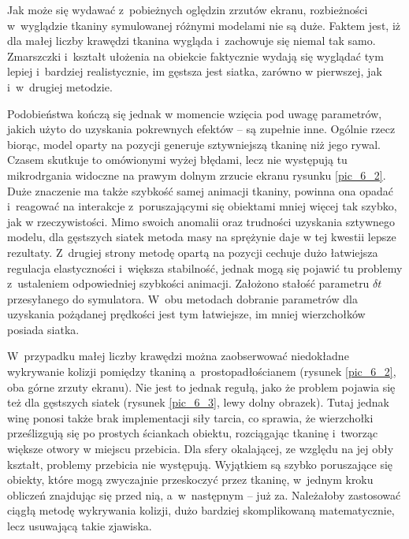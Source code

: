 		
		Jak może się wydawać z~pobieżnych oględzin zrzutów ekranu, rozbieżności w~wyglądzie tkaniny symulowanej różnymi modelami nie są duże. Faktem jest, iż dla małej liczby krawędzi tkanina wygląda i~zachowuje się niemal tak samo. Zmarszczki i~kształt ułożenia na obiekcie faktycznie wydają się wyglądać tym lepiej i~bardziej realistycznie, im gęstsza jest siatka, zarówno w pierwszej, jak i~w~drugiej metodzie. 
		
		Podobieństwa kończą się jednak w momencie wzięcia pod uwagę parametrów, jakich użyto do uzyskania pokrewnych efektów -- są zupełnie inne. Ogólnie rzecz biorąc, model oparty na pozycji generuje sztywniejszą tkaninę niż jego rywal. Czasem skutkuje to omówionymi wyżej błędami, lecz nie występują tu mikrodrgania widoczne na prawym dolnym zrzucie ekranu rysunku \ref{pic_6_2}. Duże znaczenie ma także szybkość samej animacji tkaniny, powinna ona opadać i~reagować na interakcje z~poruszającymi się obiektami mniej więcej tak szybko, jak w rzeczywistości. Mimo swoich anomalii oraz trudności uzyskania sztywnego modelu, dla gęstszych siatek metoda masy na sprężynie daje w tej kwestii lepsze rezultaty. Z~drugiej strony metodę opartą na pozycji cechuje dużo łatwiejsza regulacja elastyczności i~większa stabilność, jednak mogą się pojawić tu problemy z~ustaleniem odpowiedniej szybkości animacji. Założono stałość parametru \(\delta t \) przesyłanego do symulatora. W~obu metodach dobranie parametrów dla uzyskania pożądanej prędkości jest tym łatwiejsze, im mniej wierzchołków posiada siatka.
		
		W~przypadku małej liczby krawędzi można zaobserwować niedokładne wykrywanie kolizji pomiędzy tkaniną a~prostopadłościanem (rysunek \ref{pic_6_2}, oba górne zrzuty ekranu). Nie jest to jednak regułą, jako że problem pojawia się też dla gęstszych siatek (rysunek \ref{pic_6_3}, lewy dolny obrazek). Tutaj jednak winę ponosi także brak implementacji siły tarcia, co sprawia, że wierzchołki prześlizgują się po prostych ściankach obiektu, rozciągając tkaninę i~tworząc większe otwory w miejscu przebicia. Dla sfery okalającej, ze względu na jej obły kształt, problemy przebicia nie występują. Wyjątkiem są szybko poruszające się obiekty, które mogą zwyczajnie przeskoczyć przez tkaninę, w~jednym kroku obliczeń znajdując się przed nią, a~w~następnym -- już za. Należałoby zastosować ciągłą metodę wykrywania kolizji, dużo bardziej skomplikowaną matematycznie, lecz usuwającą takie zjawiska.
		
